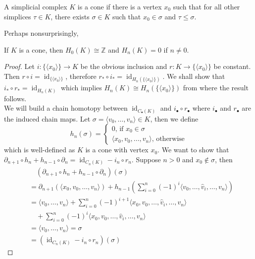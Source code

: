 \begin{definition}
    A simplicial complex $K$ is a cone if there is a vertex $x_0$ such that for all other simplices $\tau\in K$, there exists $\sigma\in K$ such that $x_0\in\sigma$ and $\tau\le\sigma$.
\end{definition}
Perhaps nonsurprisingly,
\begin{lemma}
    If $K$ is a cone, then $H_0(K)\cong\mathbb Z$ and $H_n(K)=0$ if $n\neq 0$.
\end{lemma}
\begin{proof}
    Let $i:\{\langle x_0\rangle\}\to K$ be the obvious inclusion and $r:K\to\{\langle x_0\rangle\}$ be constant.
    Then $r\circ i=\operatorname{id}_{\{\langle x_0\rangle\}}$, therefore $r_\ast\circ i_\ast=\operatorname{id}_{H_n(\{\langle x_0\rangle\})}$.
    We shall show that $i_\ast\circ r_\ast=\operatorname{id}_{H_n(K)}$ which implies $H_n(K)\cong H_n(\{\langle x_0\rangle\})$ from where the result follows.\\
    We will build a chain homotopy between $\operatorname{id}_{C_\bullet(K)}$ and $i_\bullet\circ r_\bullet$ where $i_\bullet$ and $r_\bullet$ are the induced chain maps.
    Let $\sigma=\langle v_0,\ldots,v_n\rangle\in K$, then we define
    $$h_n(\sigma)=\begin{cases}
        0\text{, if $x_0\in\sigma$}\\
        \langle x_0,v_0,\ldots,v_n\rangle\text{, otherwise}
    \end{cases}$$
    which is well-defined as $K$ is a cone with vertex $x_0$.
    We want to show that $\partial_{n+1}\circ h_n+h_{n-1}\circ\partial_n=\operatorname{id}_{C_n(K)}-i_n\circ r_n$.
    Suppose $n>0$ and $x_0\notin\sigma$, then
    \begin{align*}
        &\quad(\partial_{n+1}\circ h_n+h_{n-1}\circ\partial_n)(\sigma)\\
        &=\partial_{n+1}(\langle x_0,v_0,\ldots,v_n\rangle)+h_{n-1}\left( \sum_{i=0}^n(-1)^i\langle v_0,\ldots,\hat{v}_i,\ldots,v_n \rangle\right)\\
        &=\langle v_0,\ldots,v_n\rangle+\sum_{i=0}^n(-1)^{i+1}\langle x_0,v_0,\ldots,\hat{v}_i,\ldots,v_n \rangle\\
        &\quad+\sum_{i=0}^n(-1)^i\langle x_0,v_0,\ldots,\hat{v}_i,\ldots,v_n \rangle\\
        &=\langle v_0,\ldots,v_n\rangle=\sigma\\
        &=(\operatorname{id}_{C_n(K)}-i_n\circ r_n)(\sigma)
    \end{align*}

\end{proof}
